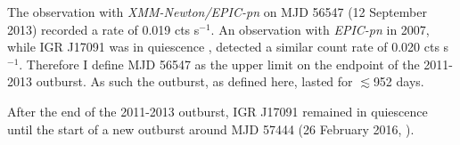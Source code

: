 \par The observation with \textit{XMM-Newton/EPIC-pn} on MJD 56547 (12 September 2013) recorded a rate of 0.019 cts s$^{-1}$.  An observation with \textit{EPIC-pn} in 2007, while IGR J17091 was in quiescence \citep{Wijnands_Quiescence}, detected a similar count rate of 0.020 cts s$^{-1}$.  Therefore I define MJD 56547 as the upper limit on the endpoint of the 2011-2013 outburst.  As such the outburst, as defined here, lasted for $\lesssim$952 days.
\par After the end of the 2011-2013 outburst, IGR J17091 remained in quiescence until the start of a new outburst around MJD 57444 (26 February 2016, \citealp{Miller_2016Outburst}).

\subsection{\rxte}

\label{sec:IGRclassesintro}

